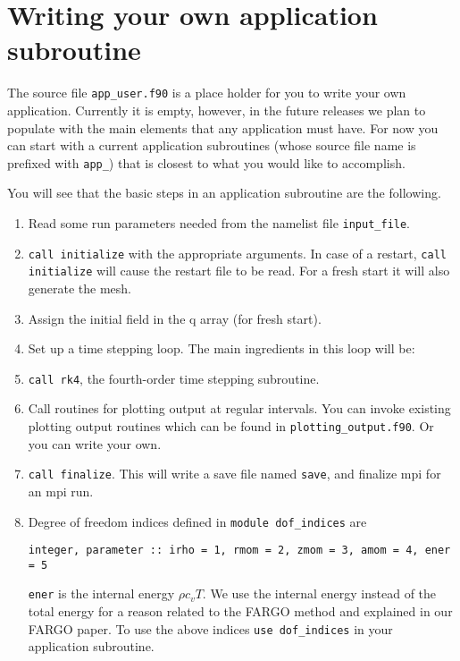 \documentclass[11pt]{amsart}
\begin{document}
\section{Writing your own application subroutine}

The source file {\tt app\_user.f90} is a place holder for you to write your own application.  Currently it is empty, however, in the future releases we plan to populate with the main elements that any application must have.  For now you can start with a current application subroutines (whose source file name is prefixed with {\tt app\_}) that is closest to what you would like to accomplish.

You will see that the basic steps in an application subroutine are the following.

\begin{enumerate}
\item Read some run parameters needed from the namelist file {\tt input\_file}.
\item {\tt call initialize} with the appropriate arguments.
In case of a restart, {\tt call initialize} will cause the restart file to be read.
For a fresh start it will also generate the mesh.
\item Assign the initial field in the q array (for fresh start).
\item Set up a time stepping loop.  The main ingredients in this loop
will be:
\item {\tt call rk4}, the fourth-order time stepping subroutine.
\item Call routines for plotting output at regular intervals.  You can
invoke existing plotting output routines which can be found in
{\tt plotting\_output.f90}.  Or you can write your own.

\item {\tt call finalize}.  This will write a save file named {\tt save},
and finalize mpi for an mpi run.

\item Degree of freedom indices defined in {\tt module dof\_indices} are
\begin{verbatim}
integer, parameter :: irho = 1, rmom = 2, zmom = 3, amom = 4, ener = 5
\end{verbatim}
{\tt ener} is the internal energy $\rho c_v T$.  We use the internal energy instead of the total energy for a reason related to the FARGO method and explained in our FARGO paper.
To use the above indices {\tt use dof\_indices} in your application subroutine.
\end{enumerate}
\end{document}
